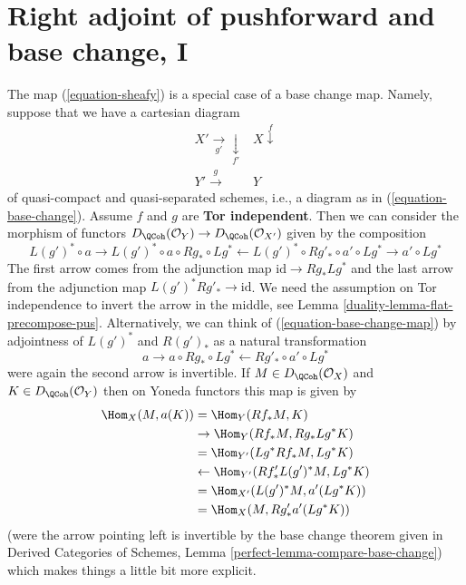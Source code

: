\section{Right adjoint of pushforward and base change, I}
\label{duality-section-base-change-map}
The map (\ref{equation-sheafy}) is a special case of a base change map.
Namely, suppose that we have a cartesian diagram
$$
\begin{array}{cc}X' \underset{g'}{\longrightarrow}\underset{f'}{\downarrow} & X \overset{f}{\downarrow} \\ Y' \overset{g}{\longrightarrow} & Y\end{array}
$$
of quasi-compact and quasi-separated schemes, i.e., a diagram as in
(\ref{equation-base-change}). Assume $f$ and $g$ are {\bf Tor independent}.
Then we can consider the morphism of functors
$D_\QCoh(\mathcal{O}_Y) \to D_\QCoh(\mathcal{O}_{X'})$
given by the composition
\begin{equation}
\label{equation-base-change-map}
L(g')^* \circ a \to
L(g')^* \circ a \circ Rg_* \circ Lg^* \leftarrow
L(g')^* \circ Rg'_* \circ a' \circ Lg^* \to a' \circ Lg^*
\end{equation}
The first arrow comes from the adjunction map $\text{id} \to Rg_* Lg^*$
and the last arrow from the adjunction map $L(g')^*Rg'_* \to \text{id}$.
We need the assumption on Tor independence to invert the arrow
in the middle, see Lemma \ref{duality-lemma-flat-precompose-pus}.
Alternatively, we can think of (\ref{equation-base-change-map}) by
adjointness of $L(g')^*$ and $R(g')_*$ as a natural transformation
$$
a \to a \circ Rg_* \circ Lg^* \leftarrow Rg'_* \circ a' \circ Lg^*
$$
were again the second arrow is invertible. If $M \in D_\QCoh(\mathcal{O}_X)$
and $K \in D_\QCoh(\mathcal{O}_Y)$
then on Yoneda functors this map is given by
\begin{align*}
\Hom_X(M, a(K))
& =
\Hom_Y(Rf_*M, K) \\
& \to
\Hom_Y(Rf_*M, Rg_* Lg^*K) \\
& =
\Hom_{Y'}(Lg^*Rf_*M, Lg^*K) \\
& \leftarrow
\Hom_{Y'}(Rf'_* L(g')^*M, Lg^*K) \\
& =
\Hom_{X'}(L(g')^*M, a'(Lg^*K)) \\
& =
\Hom_X(M, Rg'_*a'(Lg^*K))
\end{align*}
(were the arrow pointing left is invertible by the base
change theorem given in
Derived Categories of Schemes, Lemma \ref{perfect-lemma-compare-base-change})
which makes things a little bit more explicit.

